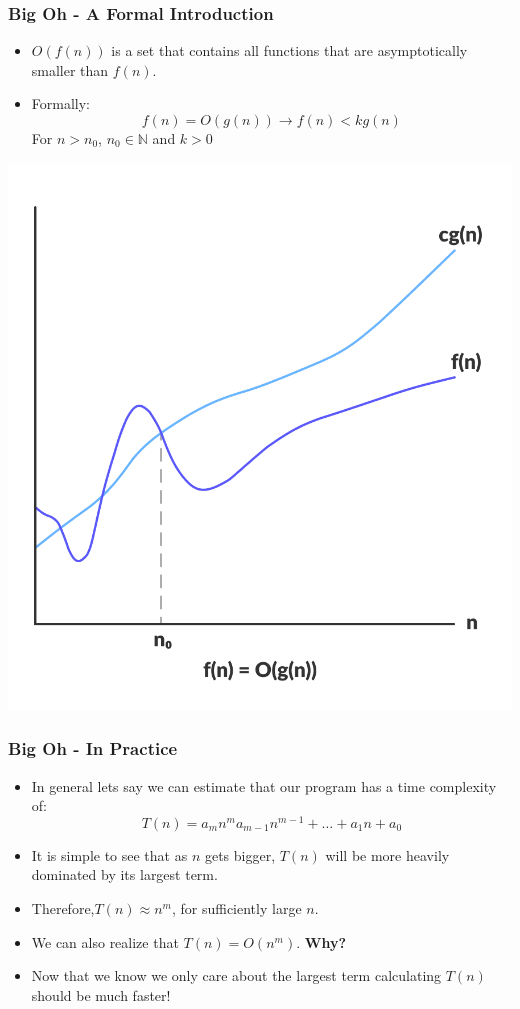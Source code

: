 \documentclass{beamer}
\begin{document}
\begin{frame}
	\frametitle{Big Oh - A Formal Introduction}

	\begin{itemize}
		\item $O(f(n))$ is a set that contains all functions that are asymptotically smaller than $f(n)$.
		\item Formally:
			$$f(n) = O(g(n)) \rightarrow f(n) < kg(n)$$ 
			For $n > n_0$, $n_0 \in \mathbb{N}$ and $ k > 0$
	\end{itemize}

	\begin{center}
		\includegraphics[scale=0.25]{images/big-oh}
	\end{center}
\end{frame}

\begin{frame}
	\frametitle{Big Oh - In Practice}

	\begin{itemize}
		\item In general lets say we can estimate that our program has a time complexity of:
			$$T(n) = a_mn^m a_{m - 1}n^{m - 1} + \ldots + a_1n + a_0$$
		\item It is simple to see that as $n$ gets bigger, $T(n)$ will be more heavily dominated by its largest term.
		\item Therefore,$T(n) \approx n^m$, for sufficiently large $n$.
		\item We can also realize that $T(n) = O(n^m)$. \textbf{Why?}
		\item Now that we know we only care about the largest term calculating $T(n)$ should be much faster!
	\end{itemize}
\end{frame}
\end{document}
